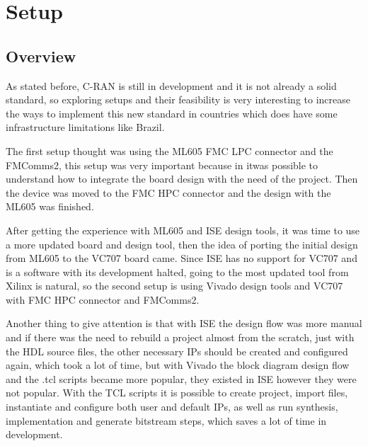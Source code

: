 \section{Setup}
\label{impl:setup}

\subsection{Overview}

As stated before, C-RAN is still in development and it is not already a solid
standard, so exploring setups and their feasibility is very interesting to
increase the ways to implement this new standard in countries which does have
some infrastructure limitations like Brazil.

The first setup thought was using the ML605 FMC LPC connector and the
FMComms2, this setup was very important because in itwas possible to understand
how to integrate the board design with the need of the project. Then the device
was moved to the FMC HPC connector and the design with the ML605 was finished.

After getting the experience with ML605 and ISE design tools, it was time to use
a more updated board and design tool, then the idea of porting the initial
design from ML605 to the VC707 board came. Since ISE has no support for VC707
and is a software with its development halted, going to the most updated tool
from Xilinx is natural, so the second setup is using Vivado design tools and
VC707 with FMC HPC connector and FMComms2.

Another thing to give attention is that with ISE the design flow was more manual
and if there was the need to rebuild a project almost from the scratch, just
with the HDL source files, the other necessary IPs should be created and
configured again, which took a lot of time, but with Vivado the block diagram
design flow and the .tcl scripts became more popular, they existed in ISE
however they were not popular. With the TCL scripts it is possible to create
project, import files, instantiate and configure both user and default IPs, as
well as run synthesis, implementation and generate bitstream steps, which saves
a lot of time in development.

